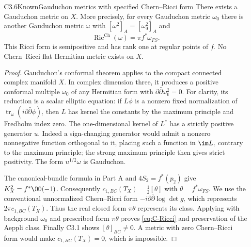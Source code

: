\begin{claim}{C3.6}{Known}{Gauduchon metrics with specified Chern--Ricci form}
There exists a Gauduchon metric on $X$.  More precisely, for every
Gauduchon metric $\omega_0$ there is another Gauduchon metric
$\omega$ with $[\omega^2]_A=[\omega_0^2]_A$ and
\begin{equation}\label{eq:C-Ricci}
\operatorname{Ric}^{\mathrm{Ch}}(\omega)=\pi f^*\omega_{FS}.
\end{equation}
This Ricci form is semipositive and has rank one at regular points
of $f$.  No Chern--Ricci-flat Hermitian metric exists on $X$.
\end{claim}
\begin{proof}
Gauduchon's conformal theorem
\citep[Theorem 2, pp. 132--133]{Gauduchon1985} applies to the compact
connected complex manifold $X$.  In complex dimension three, it
produces a positive conformal multiple $\omega_0$ of any Hermitian
form with $\partial\bar\partial\omega_0^2=0$.
For clarity, its reduction is a scalar elliptic equation: if
$L\phi$ is a nonzero fixed normalization of
$\operatorname{tr}_\omega(i\partial\bar\partial\phi)$, then
$L$ has kernel the constants by the maximum principle and Fredholm
index zero.  The one-dimensional kernel of $L^*$ has a strictly
positive generator $u$.  Indeed a sign-changing generator would
admit a nonzero nonnegative function orthogonal to it, placing such
a function in $\im L$, contrary to the maximum principle; the strong
maximum principle then gives strict positivity.  The form
$u^{1/2}\omega$ is Gauduchon.

The canonical-bundle formula in Part A and $4S_2=f^*(p_2)$ give
$K_X^2=f^*\OO(-1)$.  Consequently
$c_{1,BC}(T_X)=\tfrac12[\theta]$ with
$\theta=f^*\omega_{FS}$.  We use the conventional unnormalized
Chern--Ricci form $-i\partial\bar\partial\log\det g$,
which represents $2\pi c_{1,BC}(T_X)$.  Thus the real closed form
$\pi\theta$ represents its class.  Applying
\citet[Theorem 1.3]{STW2017} with background $\omega_0$ and prescribed
form $\pi\theta$ proves \eqref{eq:C-Ricci} and preservation of the
Aeppli class.  Finally C3.1 shows $[\theta]_{BC}\ne0$.  A metric
with zero Chern--Ricci form would make $c_{1,BC}(T_X)=0$, which is
impossible.
\end{proof}

